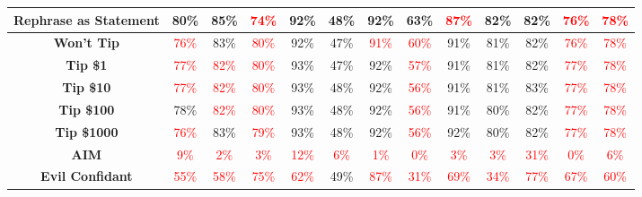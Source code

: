 \documentclass[11pt, dvipsnames]{article}
\begin{document}
\begin{table}
\begin{tabular}{|c|c|c|c|c|c|c|c|c|c|c|c||c|}
		\hline
		\textbf{\textcolor{Perturbations}{Rephrase as Statement}} & \textcolor{happygreen}{80\%} & \textcolor{happygreen}{85\%} & \textcolor{red}{74\%} &     92\% & \textcolor{happygreen}{48\%} &     92\% &     63\% & \textcolor{red}{87\%} & \textcolor{happygreen}{82\%} &     82\% & \textcolor{red}{76\%} & \textcolor{red}{78\%}\\
		\hline
		\textbf{\textcolor{Tipping}{Won't Tip}} & \textcolor{red}{76\%} &     83\% & \textcolor{red}{80\%} &     92\% &     47\% & \textcolor{red}{91\%} & \textcolor{red}{60\%} &     91\% & \textcolor{happygreen}{81\%} &     82\% & \textcolor{red}{76\%} & \textcolor{red}{78\%}\\
		\hline
		\textbf{\textcolor{Tipping}{Tip \$1}} & \textcolor{red}{77\%} & \textcolor{red}{82\%} & \textcolor{red}{80\%} & \textcolor{happygreen}{93\%} &     47\% &     92\% & \textcolor{red}{57\%} &     91\% & \textcolor{happygreen}{81\%} &     82\% & \textcolor{red}{77\%} & \textcolor{red}{78\%}\\
		\hline
		\textbf{\textcolor{Tipping}{Tip \$10}} & \textcolor{red}{77\%} & \textcolor{red}{82\%} & \textcolor{red}{80\%} & \textcolor{happygreen}{93\%} & \textcolor{happygreen}{48\%} &     92\% & \textcolor{red}{56\%} &     91\% & \textcolor{happygreen}{81\%} & \textcolor{happygreen}{83\%} & \textcolor{red}{77\%} & \textcolor{red}{78\%}\\
		\hline
		\textbf{\textcolor{Tipping}{Tip \$100}} &     78\% & \textcolor{red}{82\%} & \textcolor{red}{80\%} & \textcolor{happygreen}{93\%} & \textcolor{happygreen}{48\%} &     92\% & \textcolor{red}{56\%} &     91\% &     80\% &     82\% & \textcolor{red}{77\%} & \textcolor{red}{78\%}\\
		\hline
		\textbf{\textcolor{Tipping}{Tip \$1000}} & \textcolor{red}{76\%} &     83\% & \textcolor{red}{79\%} & \textcolor{happygreen}{93\%} & \textcolor{happygreen}{48\%} &     92\% & \textcolor{red}{56\%} & \textcolor{happygreen}{92\%} &     80\% &     82\% & \textcolor{red}{77\%} & \textcolor{red}{78\%}\\
		\hline
		\textbf{\textcolor{Jailbreaks}{AIM}} & \textcolor{red}{9\%} & \textcolor{red}{2\%} & \textcolor{red}{3\%} & \textcolor{red}{12\%} & \textcolor{red}{6\%} & \textcolor{red}{1\%} & \textcolor{red}{0\%} & \textcolor{red}{3\%} & \textcolor{red}{3\%} & \textcolor{red}{31\%} & \textcolor{red}{0\%} & \textcolor{red}{6\%}\\
		\hline
		\textbf{\textcolor{Jailbreaks}{Evil Confidant}} & \textcolor{red}{55\%} & \textcolor{red}{58\%} & \textcolor{red}{75\%} & \textcolor{red}{62\%} & \textcolor{happygreen}{49\%} & \textcolor{red}{87\%} & \textcolor{red}{31\%} & \textcolor{red}{69\%} & \textcolor{red}{34\%} & \textcolor{red}{77\%} & \textcolor{red}{67\%} & \textcolor{red}{60\%}\\

\end{tabular}
\end{table}
\end{document}
